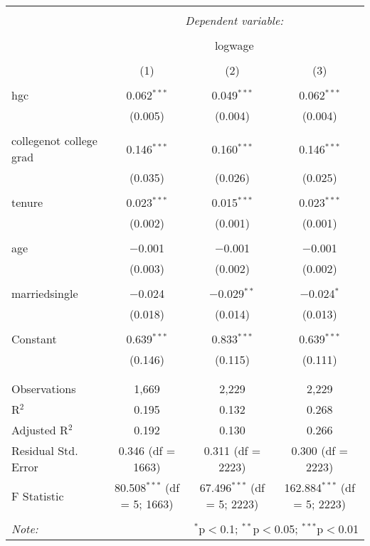 \documentclass[11pt,a4paper]{article}
\begin{document}
\begin{enumerate}
\begin{description}
\begin{table}[!htbp] \centering 
  \caption{} 
  \label{} 
\begin{tabular}{@{\extracolsep{5pt}}lccc} 
\\[-1.8ex]\hline 
\hline \\[-1.8ex] 
 & \multicolumn{3}{c}{\textit{Dependent variable:}} \\ 
\cline{2-4} 
\\[-1.8ex] & \multicolumn{3}{c}{logwage} \\ 
\\[-1.8ex] & (1) & (2) & (3)\\ 
\hline \\[-1.8ex] 
 hgc & 0.062$^{***}$ & 0.049$^{***}$ & 0.062$^{***}$ \\ 
  & (0.005) & (0.004) & (0.004) \\ 
  & & & \\ 
 collegenot college grad & 0.146$^{***}$ & 0.160$^{***}$ & 0.146$^{***}$ \\ 
  & (0.035) & (0.026) & (0.025) \\ 
  & & & \\ 
 tenure & 0.023$^{***}$ & 0.015$^{***}$ & 0.023$^{***}$ \\ 
  & (0.002) & (0.001) & (0.001) \\ 
  & & & \\ 
 age & $-$0.001 & $-$0.001 & $-$0.001 \\ 
  & (0.003) & (0.002) & (0.002) \\ 
  & & & \\ 
 marriedsingle & $-$0.024 & $-$0.029$^{**}$ & $-$0.024$^{*}$ \\ 
  & (0.018) & (0.014) & (0.013) \\ 
  & & & \\ 
 Constant & 0.639$^{***}$ & 0.833$^{***}$ & 0.639$^{***}$ \\ 
  & (0.146) & (0.115) & (0.111) \\ 
  & & & \\ 
\hline \\[-1.8ex] 
Observations & 1,669 & 2,229 & 2,229 \\ 
R$^{2}$ & 0.195 & 0.132 & 0.268 \\ 
Adjusted R$^{2}$ & 0.192 & 0.130 & 0.266 \\ 
Residual Std. Error & 0.346 (df = 1663) & 0.311 (df = 2223) & 0.300 (df = 2223) \\ 
F Statistic & 80.508$^{***}$ (df = 5; 1663) & 67.496$^{***}$ (df = 5; 2223) & 162.884$^{***}$ (df = 5; 2223) \\ 
\hline 
\hline \\[-1.8ex] 
\textit{Note:}  & \multicolumn{3}{r}{$^{*}$p$<$0.1; $^{**}$p$<$0.05; $^{***}$p$<$0.01} \\ 
\end{tabular} 
\end{table} 
              

\end{description}
\end{enumerate}
\end{document}
